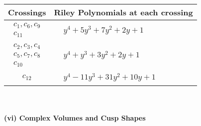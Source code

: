 \documentclass[1p]{elsarticle_modified}
\theoremstyle{definition}
\begin{document}
\begin{tabular}{m{50pt}|m{274pt}}
Crossings & \hspace{64pt}Riley Polynomials at each crossing \\
\hline $$\begin{aligned}c_{1},c_{6},c_{9}\\c_{11}\end{aligned}$$&$\begin{aligned}
&y^4+5 y^3+7 y^2+2 y+1
\end{aligned}$\\
\hline $$\begin{aligned}c_{2},c_{3},c_{4}\\c_{5},c_{7},c_{8}\\c_{10}\end{aligned}$$&$\begin{aligned}
&y^4+y^3+3 y^2+2 y+1
\end{aligned}$\\
\hline $$\begin{aligned}c_{12}\end{aligned}$$&$\begin{aligned}
&y^4-11 y^3+31 y^2+10 y+1
\end{aligned}$\\
\hline
\end{tabular}\\~\\
\newpage\flushleft \textbf{(vi) Complex Volumes and Cusp Shapes}
\end{document}
